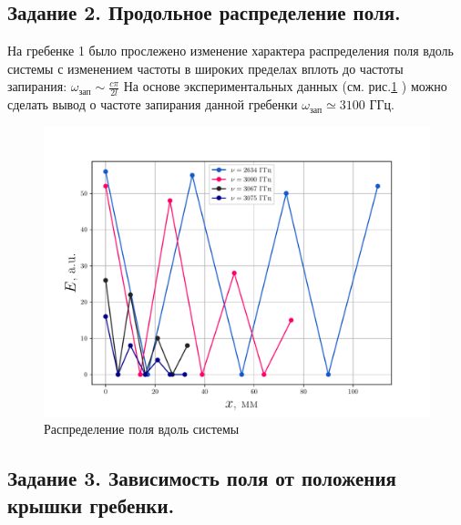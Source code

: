 \subsection*{Задание 2. Продольное распределение поля.} %
На гребенке 1 было прослежено изменение характера распределения поля вдоль системы с изменением частоты в широких пределах вплоть до частоты запирания: $\omega_{\text{зап}}\sim \frac{c \pi}{2l}$ 
На основе экспериментальных данных (см. рис.\ref{fig:2} ) можно сделать вывод о частоте запирания данной гребенки $\omega_{\text{зап}}\simeq 3100 $ ГГц. 
\begin{figure}[h!]
    \centering
    \includegraphics[width=0.9\linewidth]{rec/task2.pdf}
    \caption{Распределение поля вдоль системы}
    \label{fig:2}
\end{figure}

\subsection*{Задание 3. Зависимость поля от положения крышки гребенки.} %


